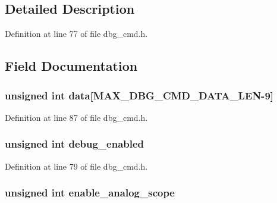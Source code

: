 \subsection{Detailed Description}


Definition at line 77 of file dbg\-\_\-cmd.\-h.



\subsection{Field Documentation}
\hypertarget{structdbg__cmd__type__connect_ae7632a28dd6ad1e333af08fca1d0f6cb}{
\subsubsection[{data}]{\setlength{\rightskip}{0pt plus 5cm}unsigned int data\mbox{[}{\bf M\-A\-X\-\_\-\-D\-B\-G\-\_\-\-C\-M\-D\-\_\-\-D\-A\-T\-A\-\_\-\-L\-E\-N}-\/9\mbox{]}}}\label{structdbg__cmd__type__connect_ae7632a28dd6ad1e333af08fca1d0f6cb}


Definition at line 87 of file dbg\-\_\-cmd.\-h.

\hypertarget{structdbg__cmd__type__connect_a641ec70530418c7d2b8aef7e638d4a71}{
\subsubsection[{debug\-\_\-enabled}]{\setlength{\rightskip}{0pt plus 5cm}unsigned int debug\-\_\-enabled}}\label{structdbg__cmd__type__connect_a641ec70530418c7d2b8aef7e638d4a71}


Definition at line 79 of file dbg\-\_\-cmd.\-h.

\hypertarget{structdbg__cmd__type__connect_a8f69251f33a0e0c36839fa771ec1993e}{
\subsubsection[{enable\-\_\-analog\-\_\-scope}]{\setlength{\rightskip}{0pt plus 5cm}unsigned int enable\-\_\-analog\-\_\-scope}}\label{structdbg__cmd__type__connect_a8f69251f33a0e0c36839fa771ec1993e}


